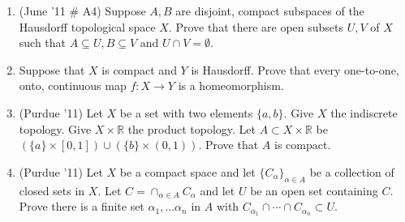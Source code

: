 \documentclass[psamsfonts, 11pt, reqno]{amsart}
\begin{document}
\begin{enumerate}
\item (June '11 \# A4) Suppose $A, B$ are disjoint, compact subspaces of the Hausdorff topological space $X$.  Prove that
there are open subsets $U, V$ of $X$ such that $A \subseteq U, B \subseteq V$ and $U \cap V = \emptyset$.
\vfill

\item Suppose that $X$ is compact and $Y$ is Hausdorff.  Prove that every one-to-one, onto, continuous map
$f: X \rightarrow Y$ is a homeomorphism.
\vfill

\item (Purdue '11) Let $X$ be a set with two elements $\{ a, b \}$.  Give $X$ the indiscrete topology.  Give $X \times \mathbb{R}$ the
product topology.  Let $A \subset X \times \mathbb{R}$ be $( \{ a \} \times [0,1]) \cup (\{ b \} \times (0,1))$.  Prove that
$A$ is compact.
\vfill

\item (Purdue '11) Let $X$ be a compact space and let $\{ C_{\alpha} \}_{\alpha \in A}$ be a collection of closed sets in $X$.
Let $C = \cap_{\alpha \in A} C_{\alpha}$ and let $U$ be an open set containing $C$.  Prove there is a finite set $\alpha_1, ... \alpha_n$
in $A$ with $C_{\alpha_1} \cap \cdots \cap C_{\alpha_n} \subset U$.
\vfill

\end{enumerate}
\end{document}
